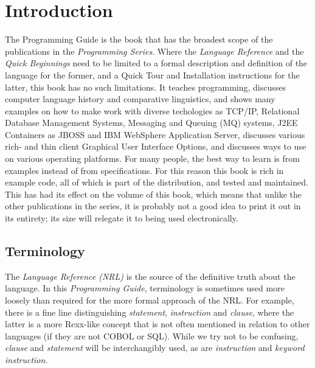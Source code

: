 \chapter{Introduction}
The Programming Guide is the book that has the broadest scope of the publications in the \emph{\nr{} Programming Series}. Where the \emph{Language Reference} and the \emph{Quick Beginnings} need to be limited to a formal description and definition of the \nr{} language for the former, and a Quick Tour and Installation instructions for the latter, this book has no such limitations. It teaches programming, discusses computer language history and comparative linguistics, and shows many examples on how to make \nr{} work with diverse techologies as TCP/IP, Relational Database Management Systems, Messaging and Queuing (MQ\textsuperscript{\texttrademark}) systems, J2EE Containers as JBOSS\textsuperscript{\texttrademark} and IBM WebSphere Application Server\textsuperscript{\texttrademark}, discusses various rich- and thin client Graphical User Interface Options, and discusses ways to use \nr{} on various operating platforms. For many people, the best way to learn is from examples instead of from specifications. For this reason this book is rich in example code, all of which is part of the \nr{} distribution, and tested and maintained. This has had its effect on the volume of this book, which means that unlike the other publications in the series, it is probably not a good idea to print it out in its entirety; its size will relegate it to being used electronically.
\section*{Terminology}
The \emph{\nr{} Language Reference (NRL)} is the source of the definitive truth about the language. In this \emph{Programming Guide}, terminology is sometimes used more loosely than required for the more formal approach of the NRL. For example, there is a fine line distinguishing \emph{statement}, \emph{instruction} and \emph{clause}, where the latter is a more Rexx-like concept that is not often mentioned in relation to other languages (if they are not COBOL or SQL). While we try not to be confusing, \emph{clause} and \emph{statement} will be interchangibly used, as are \emph{instruction} and \emph{keyword instruction}.

